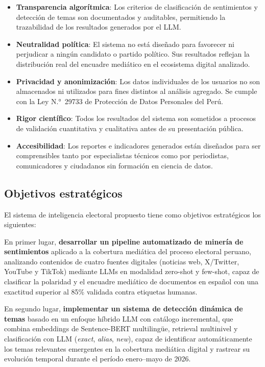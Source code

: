 \begin{itemize}
    \item \textbf{Transparencia algorítmica}: Los criterios de clasificación de sentimientos y detección de temas son documentados y auditables, permitiendo la trazabilidad de los resultados generados por el LLM.

    \item \textbf{Neutralidad política}: El sistema no está diseñado para favorecer ni perjudicar a ningún candidato o partido político. Sus resultados reflejan la distribución real del encuadre mediático en el ecosistema digital analizado.

    \item \textbf{Privacidad y anonimización}: Los datos individuales de los usuarios no son almacenados ni utilizados para fines distintos al análisis agregado. Se cumple con la Ley N.°~29733 de Protección de Datos Personales del Perú.

    \item \textbf{Rigor científico}: Todos los resultados del sistema son sometidos a procesos de validación cuantitativa y cualitativa antes de su presentación pública.

    \item \textbf{Accesibilidad}: Los reportes e indicadores generados están diseñados para ser comprensibles tanto por especialistas técnicos como por periodistas, comunicadores y ciudadanos sin formación en ciencia de datos.
\end{itemize}

\subsection{Objetivos estratégicos}

El sistema de inteligencia electoral propuesto tiene como objetivos estratégicos los siguientes:

En primer lugar, \textbf{desarrollar un pipeline automatizado de minería de sentimientos} aplicado a la cobertura mediática del proceso electoral peruano, analizando contenidos de cuatro fuentes digitales (noticias web, X/Twitter, YouTube y TikTok) mediante LLMs en modalidad zero-shot y few-shot, capaz de clasificar la polaridad y el encuadre mediático de documentos en español con una exactitud superior al 85\% validada contra etiquetas humanas.

En segundo lugar, \textbf{implementar un sistema de detección dinámica de temas} basado en un enfoque híbrido LLM con catálogo incremental, que combina embeddings de Sentence-BERT multilingüe, retrieval multinivel y clasificación con LLM (\textit{exact}, \textit{alias}, \textit{new}), capaz de identificar automáticamente los temas relevantes emergentes en la cobertura mediática digital y rastrear su evolución temporal durante el período enero–mayo de 2026.

